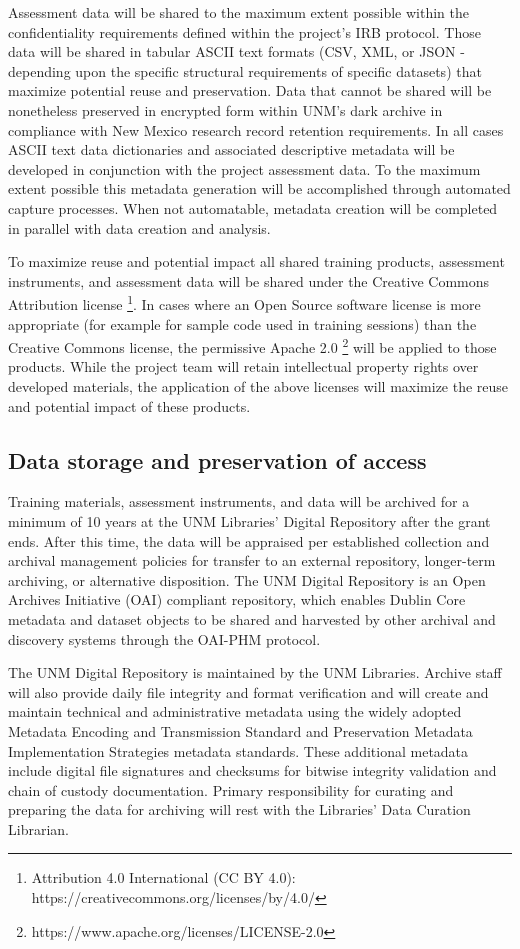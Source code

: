 \documentclass[11pt]{article}
\begin{document}
Assessment data will be shared to the maximum extent possible within the confidentiality requirements defined within the project's IRB protocol. Those data will be shared in tabular ASCII text formats (CSV, XML, or JSON - depending upon the specific structural requirements of specific datasets) that maximize potential reuse and preservation. Data that cannot be shared will be nonetheless preserved in encrypted form within UNM's dark archive in compliance with New Mexico research record retention requirements. In all cases ASCII text data dictionaries and associated descriptive metadata will be developed in conjunction with the project assessment data. To the maximum extent possible this metadata generation will be accomplished through automated capture processes. When not automatable, metadata creation will be completed in parallel with data creation and analysis. 

To maximize reuse and potential impact all shared training products, assessment instruments, and assessment data will be shared under the Creative Commons Attribution license \footnote{Attribution 4.0 International (CC BY 4.0): https://creativecommons.org/licenses/by/4.0/}. In cases where an Open Source software license is more appropriate (for example for sample code used in training sessions) than the Creative Commons license, the permissive Apache 2.0 \footnote{https://www.apache.org/licenses/LICENSE-2.0} will be applied to those products. While the project team will retain intellectual property rights over developed materials, the application of the above licenses will maximize the reuse and potential impact of these products. 

\subsection*{Data storage and preservation of
access}\label{data-storage-and-preservation-of-access}

Training materials, assessment instruments, and data will be archived for a minimum of 10 years at the UNM Libraries’ Digital Repository after the grant ends. After this time, the data will be appraised per established collection and archival management policies for transfer to an external repository, longer-term archiving, or alternative disposition. The UNM Digital Repository is an Open Archives Initiative (OAI) compliant repository, which enables Dublin Core metadata and dataset objects to be shared and harvested by other archival and discovery systems through the OAI-PHM protocol.
 
The UNM Digital Repository is maintained by the UNM Libraries. Archive staff will also provide daily file integrity and format verification and will create and maintain technical and administrative metadata using the widely adopted Metadata Encoding and Transmission Standard and Preservation Metadata Implementation Strategies metadata standards. These additional metadata include digital file signatures and checksums for bitwise integrity validation and chain of custody documentation. Primary responsibility for curating and preparing the data for archiving will rest with the Libraries’ Data Curation Librarian.
\end{document}
